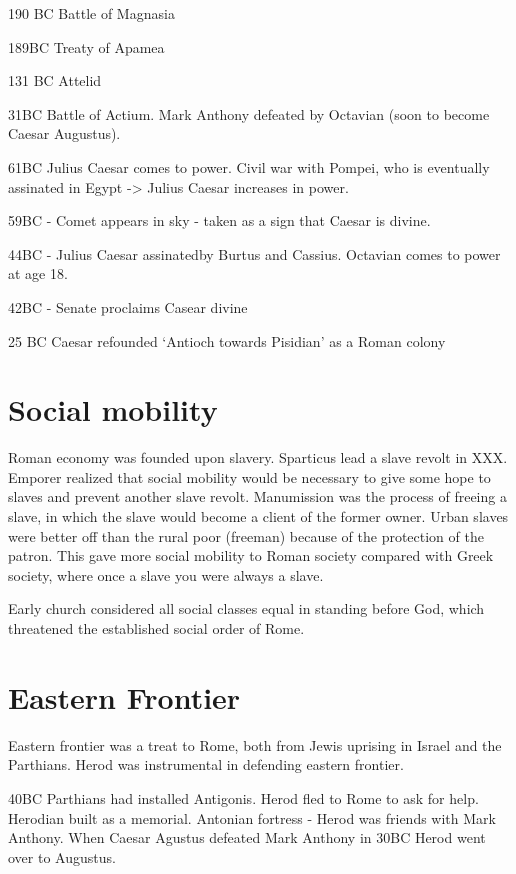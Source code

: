 \documentclass[
]{book}
\begin{document}
190 BC Battle of Magnasia

189BC Treaty of Apamea

131 BC Attelid

31BC Battle of Actium. Mark Anthony defeated by Octavian (soon to become Caesar Augustus).

61BC Julius Caesar comes to power. Civil war with Pompei, who is eventually assinated in Egypt -\textgreater{} Julius Caesar increases in power.

59BC - Comet appears in sky - taken as a sign that Caesar is divine.

44BC - Julius Caesar assinatedby Burtus and Cassius. Octavian comes to power at age 18.

42BC - Senate proclaims Casear divine

25 BC Caesar refounded `Antioch towards Pisidian' as a Roman colony

\hypertarget{social-mobility}{%
\section{Social mobility}\label{social-mobility}}

Roman economy was founded upon slavery. Sparticus lead a slave revolt in XXX. Emporer realized that social mobility would be necessary to give some hope to slaves and prevent another slave revolt. Manumission was the process of freeing a slave, in which the slave would become a client of the former owner. Urban slaves were better off than the rural poor (freeman) because of the protection of the patron. This gave more social mobility to Roman society compared with Greek society, where once a slave you were always a slave.

Early church considered all social classes equal in standing before God, which threatened the established social order of Rome.

\hypertarget{eastern-frontier}{%
\section{Eastern Frontier}\label{eastern-frontier}}

Eastern frontier was a treat to Rome, both from Jewis uprising in Israel and the Parthians. Herod was instrumental in defending eastern frontier.

40BC Parthians had installed Antigonis. Herod fled to Rome to ask for help. Herodian built as a memorial. Antonian fortress - Herod was friends with Mark Anthony. When Caesar Agustus defeated Mark Anthony in 30BC Herod went over to Augustus.
\end{document}
